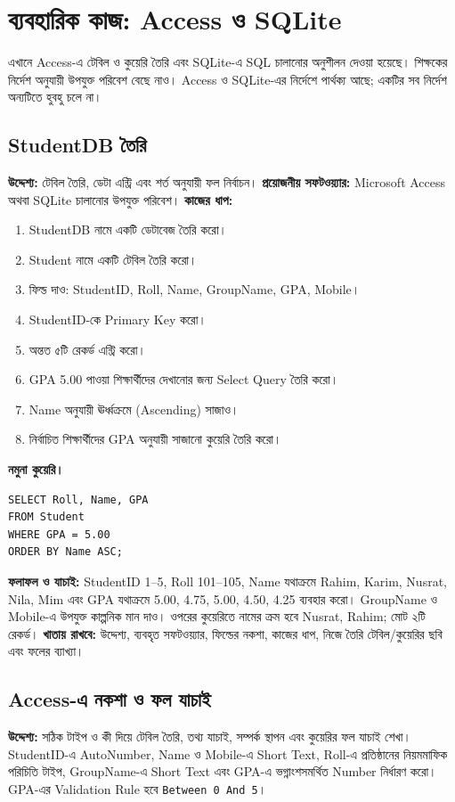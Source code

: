\section{ব্যবহারিক কাজ: Access ও SQLite}

এখানে Access-এ টেবিল ও কুয়েরি তৈরি এবং SQLite-এ SQL চালানোর অনুশীলন দেওয়া হয়েছে। শিক্ষকের নির্দেশ অনুযায়ী উপযুক্ত পরিবেশ বেছে নাও। Access ও SQLite-এর নির্দেশে পার্থক্য আছে; একটির সব নির্দেশ অন্যটিতে হুবহু চলে না।

\subsection{StudentDB তৈরি}
\textbf{উদ্দেশ্য:} টেবিল তৈরি, ডেটা এন্ট্রি এবং শর্ত অনুযায়ী ফল নির্বাচন।
\textbf{প্রয়োজনীয় সফটওয়্যার:} Microsoft Access অথবা SQLite চালানোর উপযুক্ত পরিবেশ।
\textbf{কাজের ধাপ:}
\begin{enumerate}
    \item StudentDB নামে একটি ডেটাবেজ তৈরি করো।
    \item Student নামে একটি টেবিল তৈরি করো।
    \item ফিল্ড দাও: StudentID, Roll, Name, GroupName, GPA, Mobile।
    \item StudentID-কে Primary Key করো।
    \item অন্তত ৫টি রেকর্ড এন্ট্রি করো।
    \item GPA 5.00 পাওয়া শিক্ষার্থীদের দেখানোর জন্য Select Query তৈরি করো।
    \item Name অনুযায়ী ঊর্ধ্বক্রমে (Ascending) সাজাও।
    \item নির্বাচিত শিক্ষার্থীদের GPA অনুযায়ী সাজানো কুয়েরি তৈরি করো।
\end{enumerate}

\noindent\textbf{নমুনা কুয়েরি।} \begin{verbatim}
SELECT Roll, Name, GPA
FROM Student
WHERE GPA = 5.00
ORDER BY Name ASC;
\end{verbatim}

\textbf{ফলাফল ও যাচাই:} StudentID 1--5, Roll 101--105, Name যথাক্রমে Rahim, Karim, Nusrat, Nila, Mim এবং GPA যথাক্রমে 5.00, 4.75, 5.00, 4.50, 4.25 ব্যবহার করো। GroupName ও Mobile-এ উপযুক্ত কাল্পনিক মান দাও। ওপরের কুয়েরিতে নামের ক্রম হবে Nusrat, Rahim; মোট ২টি রেকর্ড।
\textbf{খাতায় রাখবে:} উদ্দেশ্য, ব্যবহৃত সফটওয়্যার, ফিল্ডের নকশা, কাজের ধাপ, নিজে তৈরি টেবিল/কুয়েরির ছবি এবং ফলের ব্যাখ্যা।


\subsection{Access-এ নকশা ও ফল যাচাই}
\textbf{উদ্দেশ্য:} সঠিক টাইপ ও কী দিয়ে টেবিল তৈরি, তথ্য যাচাই, সম্পর্ক স্থাপন এবং কুয়েরির ফল যাচাই শেখা। StudentID-এ AutoNumber, Name ও Mobile-এ Short Text, Roll-এ প্রতিষ্ঠানের নিয়মমাফিক পরিচিতি টাইপ, GroupName-এ Short Text এবং GPA-এ ভগ্নাংশসমর্থিত Number নির্ধারণ করো। GPA-এর Validation Rule হবে \texttt{Between 0 And 5}।

